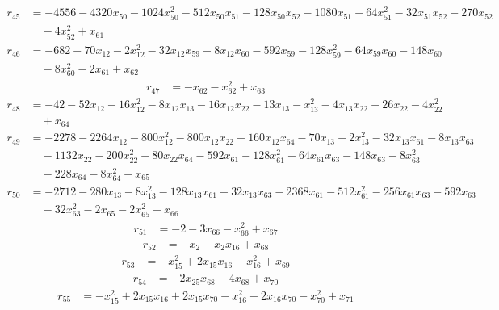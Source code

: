 \begin{align*}
r_{45}&=
-4556-4320x_{50}-1024x_{50}^{2}-512x_{50}x_{51}-128x_{50}x_{52}-1080x_{51}-64x_{51}^{2}-32x_{51}x_{52}-270x_{52} \\
&\quad -4x_{52}^{2}+x_{61}
\end{align*}
\begin{align*}
r_{46}&=
-682-70x_{12}-2x_{12}^{2}-32x_{12}x_{59}-8x_{12}x_{60}-592x_{59}-128x_{59}^{2}-64x_{59}x_{60}-148x_{60} \\
&\quad -8x_{60}^{2}-2x_{61}+x_{62}
\end{align*}
\begin{align*}
r_{47}&=
-x_{62}-x_{62}^{2}+x_{63}
\end{align*}
\begin{align*}
r_{48}&=
-42-52x_{12}-16x_{12}^{2}-8x_{12}x_{13}-16x_{12}x_{22}-13x_{13}-x_{13}^{2}-4x_{13}x_{22}-26x_{22}-4x_{22}^{2} \\
&\quad +x_{64}
\end{align*}
\begin{align*}
r_{49}&=
-2278-2264x_{12}-800x_{12}^{2}-800x_{12}x_{22}-160x_{12}x_{64}-70x_{13}-2x_{13}^{2}-32x_{13}x_{61}-8x_{13}x_{63} \\
&\quad -1132x_{22}-200x_{22}^{2}-80x_{22}x_{64}-592x_{61}-128x_{61}^{2}-64x_{61}x_{63}-148x_{63}-8x_{63}^{2} \\
&\quad -228x_{64}-8x_{64}^{2}+x_{65}
\end{align*}
\begin{align*}
r_{50}&=
-2712-280x_{13}-8x_{13}^{2}-128x_{13}x_{61}-32x_{13}x_{63}-2368x_{61}-512x_{61}^{2}-256x_{61}x_{63}-592x_{63} \\
&\quad -32x_{63}^{2}-2x_{65}-2x_{65}^{2}+x_{66}
\end{align*}
\begin{align*}
r_{51}&=
-2-3x_{66}-x_{66}^{2}+x_{67}
\end{align*}
\begin{align*}
r_{52}&=
-x_{2}-x_{2}x_{16}+x_{68}
\end{align*}
\begin{align*}
r_{53}&=
-x_{15}^{2}+2x_{15}x_{16}-x_{16}^{2}+x_{69}
\end{align*}
\begin{align*}
r_{54}&=
-2x_{25}x_{68}-4x_{68}+x_{70}
\end{align*}
\begin{align*}
r_{55}&=
-x_{15}^{2}+2x_{15}x_{16}+2x_{15}x_{70}-x_{16}^{2}-2x_{16}x_{70}-x_{70}^{2}+x_{71}
\end{align*}
